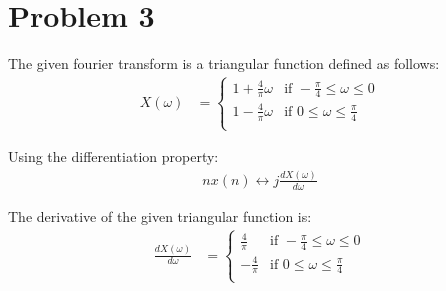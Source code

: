 \documentclass{article}
\begin{document}
\section{Problem 3}

The given fourier transform is a triangular function defined as follows:
\begin{align*}
    X(\omega) &= \begin{cases}
        1 + \frac{4}{\pi} \omega & \text{if } -\frac{\pi}{4} \leq \omega \leq 0 \\
        1 - \frac{4}{\pi} \omega & \text{if } 0 \leq \omega \leq \frac{\pi}{4} \\
    \end{cases}
\end{align*}

Using the differentiation property:
\begin{align*}
    nx(n) \leftrightarrow j \frac{dX(\omega)}{d\omega}
\end{align*}

The derivative of the given triangular function is:
\begin{align*}
    \frac{dX(\omega)}{d\omega} &= \begin{cases}
        \frac{4}{\pi} & \text{if } -\frac{\pi}{4} \leq \omega \leq 0 \\
        -\frac{4}{\pi} & \text{if } 0 \leq \omega \leq \frac{\pi}{4} \\
    \end{cases}
\end{align*}
\end{document}
